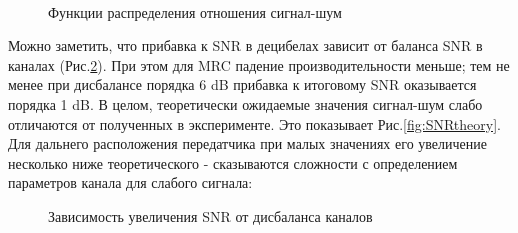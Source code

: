 \documentclass[a4paper,12pt,oneside]{scrartcl}
\begin{document}
\begin{figure}[!htb]
\begin{minipage}[h]{0.49\linewidth}
\end{minipage}
\begin{minipage}[h]{0.49\linewidth}
 \\
\end{minipage}
\caption{Функции распределения отношения сигнал-шум}
\label{fig:cdfs}
\end{figure}

Можно заметить, что прибавка к SNR в децибелах зависит от баланса SNR в каналах (Рис.\ref{fig:snrbalance}). 
При этом для MRC падение производительности меньше; тем не менее при дисбалансе порядка 6 dB прибавка к итоговому SNR оказывается порядка 1 dB. 
В целом, теоретически ожидаемые значения сигнал-шум слабо отличаются от полученных в эксперименте.
Это показывает Рис.\ref{fig:SNRtheory}. 
Для дальнего расположения передатчика при малых значениях его увеличение несколько ниже теоретического - сказываются сложности с определением параметров канала для слабого сигнала: 

\begin{figure}[h!]
\caption{Зависимость увеличения SNR от дисбаланса каналов}
\label{fig:snrbalance}
\end{figure}
\end{document}
